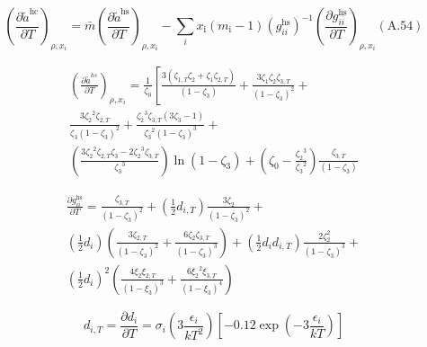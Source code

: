 \documentclass[12pt, letterpaper]{article}
\begin{document}
\begin{equation}
\left(\frac{\partial\tilde{a}^{\mathrm{hc}}}{\partial T}\right)_{\rho,x_{i}}=\bar{m}\left(\frac{\partial\tilde{a}^{\mathrm{hs}}}{\partial T}\right)_{\rho,x_{i}}-\sum_{i}x_{\mathrm{i}}(m_{\mathrm{i}}-1)(g_{ii}^{\mathrm{hs}})^{-1}\left(\frac{\partial g_{ii}^{\mathrm{hs}}}{\partial T}\right)_{\rho,x_{i}}(\mathrm{A.54})
\end{equation}

\begin{equation}
\begin{gathered}
\left(\frac{\partial\tilde{a}^{hs}}{\partial T}\right)_{\rho,x_{i}}=\frac{1}{\zeta_{0}}\left[\frac{3(\zeta_{1,T}\zeta_{2}+\zeta_{1}\zeta_{2,T})}{(1-\zeta_{3})}+\frac{3\zeta_{1}\zeta_{2}\zeta_{3,T}}{(1-\zeta_{3})^{2}}+\right.\\\frac{3{\zeta_{2}}^{2}{\zeta_{2,T}}}{\zeta_{3}{(1-\zeta_{3})}^{2}}+\frac{{\zeta_{2}}^{3}{\zeta_{3,T}}(3{\zeta_{3}}-1)}{{\zeta_{3}}^{2}{(1-\zeta_{3})}^{3}}+\\\left(\frac{3{\zeta_{2}}^{2}{\zeta_{2,T}}{\zeta_{3}}-2{\zeta_{2}}^{3}{\zeta_{3,T}}}{{\zeta_{3}}^{3}}\right)\ln(1-{\zeta_{3}})+\left({\zeta_{0}}-\frac{{\zeta_{2}}^{3}}{{\zeta_{3}}^{2}}\right)\frac{\zeta_{3,T}}{(1-\zeta_{3})}
\end{gathered}
\end{equation}

\begin{equation}
\begin{gathered}
\frac{\partial g_{ii}^{\mathrm{hs}}}{\partial T}=\frac{\zeta_{3,T}}{\left(1-\zeta_{3}\right)^{2}}+\left(\frac{1}{2}d_{i,T}\right)\frac{3\zeta_{2}}{\left(1-\zeta_{3}\right)^{2}}+\\\left(\frac{1}{2}d_{i}\right)\left(\frac{3\zeta_{2,T}}{\left(1-\zeta_{3}\right)^{2}}+\frac{6\zeta_{2}\zeta_{3,T}}{\left(1-\zeta_{3}\right)^{3}}\right)+\left(\frac{1}{2}d_{i}d_{i,T}\right)\frac{2\zeta_{2}^{2}}{\left(1-\zeta_{3}\right)^{3}}+\\\left(\frac{1}{2}d_{i}\right)^{2}\left(\frac{4\xi_{2}\xi_{2,T}}{\left(1-\xi_{3}\right)^{3}}+\frac{6\xi_{2}{}^{2}\xi_{3,T}}{\left(1-\xi_{3}\right)^{4}}\right)
\end{gathered}
\end{equation}

\begin{equation}
d_{i,T}=\frac{\partial d_i}{\partial T}=\sigma_i\left(3\frac{\epsilon_i}{kT^2}\right)\left[-0.12\exp\left(-3\frac{\epsilon_i}{kT}\right)\right]
\end{equation}
\end{document}
